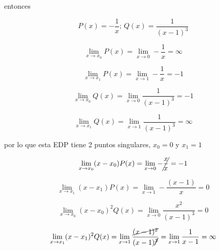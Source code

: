 \documentclass[12pt,a4paper]{article}
\begin{document}
\begin{enumerate}
\begin{enumerate}
        entonces
        
        \begin{equation*}
            P(x)= - \frac{1}{x} \text{; } Q(x) = \frac{1}{(x-1)^3}
        \end{equation*}
        
        \begin{equation*}
            \lim_{x \rightarrow x_0} P(x) =\lim_{x \rightarrow 0}- \frac{1}{x}= \infty
        \end{equation*}
        
        \begin{equation*}
            \lim_{x \rightarrow x_1} P(x) =\lim_{x \rightarrow 1}- \frac{1}{x}= -1
        \end{equation*}
        
        \begin{equation*}
            \lim_{x \rightarrow x_0} Q(x) =\lim_{x \rightarrow 0}\frac{1}{(x-1)^3}= -1
        \end{equation*}
        
        \begin{equation*}
            \lim_{x \rightarrow x_1} Q(x) =\lim_{x \rightarrow 1}\frac{1}{(x-1)^3}= \infty
        \end{equation*}
        
        por lo que esta EDP tiene 2 puntos singulares, $x_0 = 0$ y $x_1 = 1$
        
        \begin{equation*}
            \lim_{x \rightarrow x_0}(x-x_0) P(x) = \lim_{x \rightarrow 0}- \cancel{\frac{x}{x}} = -1
        \end{equation*}
        
        \begin{equation*}
            \lim_{x \rightarrow x_1}(x-x_1) P(x) = \lim_{x \rightarrow 1} - \frac{(x-1)}{x} = 0
        \end{equation*}
        
        \begin{equation*}
            \lim_{x \rightarrow x_0}(x-x_0)^2 Q(x) = \lim_{x \rightarrow 0} \frac{x^2}{(x-1)^3} = 0
        \end{equation*}
        
        \begin{equation*}
            \lim_{x \rightarrow x_1}(x-x_1)^2 Q(x) = \lim_{x \rightarrow 1} \frac{\cancel{(x-1)^2}}{(x-1)\cancel{^3}} = \lim_{x \rightarrow 1} \frac{1}{x-1} = \infty
        \end{equation*}
        

\end{enumerate}
\end{enumerate}
\end{document}

